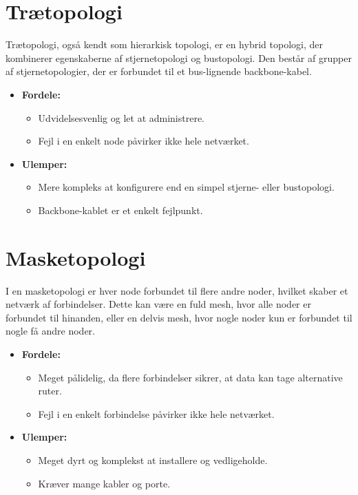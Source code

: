\section{Trætopologi}
Trætopologi, også kendt som hierarkisk topologi, er en hybrid topologi, der kombinerer egenskaberne af stjernetopologi og bustopologi. Den består af grupper af stjernetopologier, der er forbundet til et bus-lignende backbone-kabel.
\begin{itemize}
	\item \textbf{Fordele:}
	\begin{itemize}
		\item Udvidelsesvenlig og let at administrere.
		\item Fejl i en enkelt node påvirker ikke hele netværket.
	\end{itemize}
	\item \textbf{Ulemper:}
	\begin{itemize}
		\item Mere kompleks at konfigurere end en simpel stjerne- eller bustopologi.
		\item Backbone-kablet er et enkelt fejlpunkt.
	\end{itemize}
\end{itemize}

\section{Masketopologi}
I en masketopologi er hver node forbundet til flere andre noder, hvilket skaber et netværk af forbindelser. Dette kan være en fuld mesh, hvor alle noder er forbundet til hinanden, eller en delvis mesh, hvor nogle noder kun er forbundet til nogle få andre noder.
\begin{itemize}
	\item \textbf{Fordele:}
	\begin{itemize}
		\item Meget pålidelig, da flere forbindelser sikrer, at data kan tage alternative ruter.
		\item Fejl i en enkelt forbindelse påvirker ikke hele netværket.
	\end{itemize}
	\item \textbf{Ulemper:}
	\begin{itemize}
		\item Meget dyrt og komplekst at installere og vedligeholde.
		\item Kræver mange kabler og porte.
	\end{itemize}
\end{itemize}


